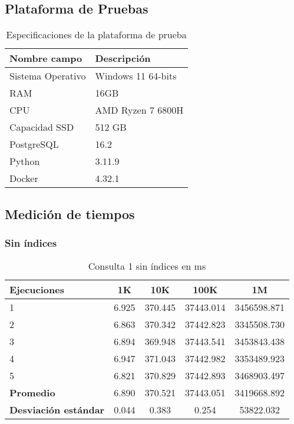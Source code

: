 \documentclass[12pt,a4paper]{article}
\begin{document}
\clearpage
\subsection{Plataforma de Pruebas}
\begin{table}[h!]
\centering
\begin{tabular}{|l|l|}
\hline
\textbf{Nombre campo}       & \textbf{Descripción}                \\
\hline
Sistema Operativo           & Windows 11 64-bits                  \\
RAM                         & 16GB                                \\
CPU                         & AMD Ryzen 7 6800H                   \\
Capacidad SSD               & 512 GB                              \\
PostgreSQL                  & 16.2                                \\
Python                      & 3.11.9                              \\
Docker                      & 4.32.1                              \\
\hline
\end{tabular}
\caption{Especificaciones de la plataforma de prueba}
\label{table:especificaciones_plataforma_prueba}
\end{table}

\subsection{Medición de tiempos}

\subsubsection{Sin índices}

\begin{table}[h!]
\centering
\begin{tabular}{|l|c|c|c|c|}
\hline
\textbf{Ejecuciones} & \textbf{1K} & \textbf{10K} & \textbf{100K} & \textbf{1M} \\
\hline
1 & 6.925 & 370.445 & 37443.014 & 3456598.871 \\
2 & 6.863 & 370.342 & 37442.823 & 3345508.730 \\
3 & 6.894 & 369.948 & 37443.541 & 3453843.438 \\
4 & 6.947 & 371.043 & 37442.982 & 3353489.923 \\
5 & 6.821 & 370.829 & 37442.893 & 3468903.497 \\
\hline
\textbf{Promedio} & 6.890 & 370.521 & 37443.051 & 3419668.892 \\
\textbf{Desviación estándar} & 0.044 & 0.383 & 0.254 & 53822.032 \\
\hline
\end{tabular}
\caption{Consulta 1 sin índices en ms}
\label{table:consulta1_sin_indices}
\end{table}
\end{document}
